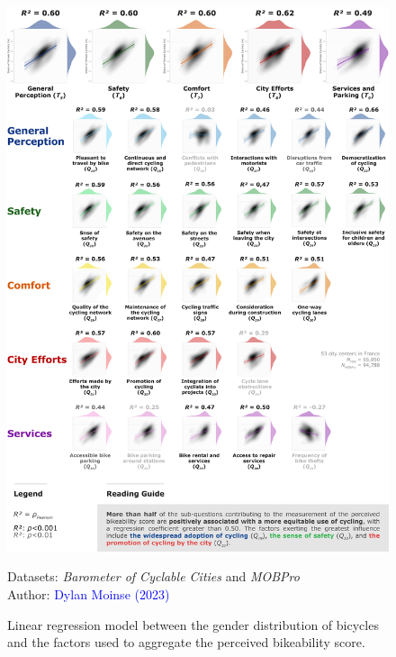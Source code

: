 \begin{refsegment}
\begin{figure}[h!]\vspace*{4pt}
    \caption{Linear regression model between the gender distribution of bicycles and the factors used to aggregate the perceived bikeability score.}
    \label{fig-chap4:regression-genre-cyclabilite-questions-detailees}
    \centerline{\includegraphics[width=1\columnwidth]{src/Figures/Chap-4/EN_Regression_sous_facteurs_OLS.png}}
    \vspace{5pt}
    \begin{flushright}\scriptsize{
    Datasets: \textsl{Barometer of Cyclable Cities} \textcolor{blue}{\autocite{fub_barometre_2021}} and \textsl{MOBPro} \textcolor{blue}{\autocite{insee_documentation_2023}}
    \\
    Author: \textcolor{blue}{Dylan Moinse (2023)}
    }\end{flushright}
\end{figure}


\end{refsegment}
